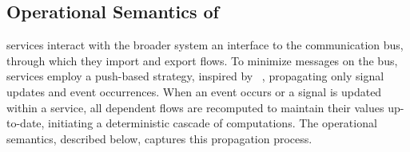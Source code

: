 \subsection{Operational Semantics of \GRFRP}
\label{sec:semantics:grfrp:opsem}

\GRFRP services interact with the broader system \via an interface to the communication bus,
through which they import and export flows. To minimize messages on the bus, services employ
a push-based strategy, inspired by \frp~\cite{DBLP:conf/haskell/Elliott09}, propagating only signal
updates and event occurrences. When an event occurs or a signal is updated within a service, all
dependent flows are recomputed to maintain their values up-to-date, initiating a
deterministic cascade of computations. The operational semantics, described below,
captures this propagation process.

